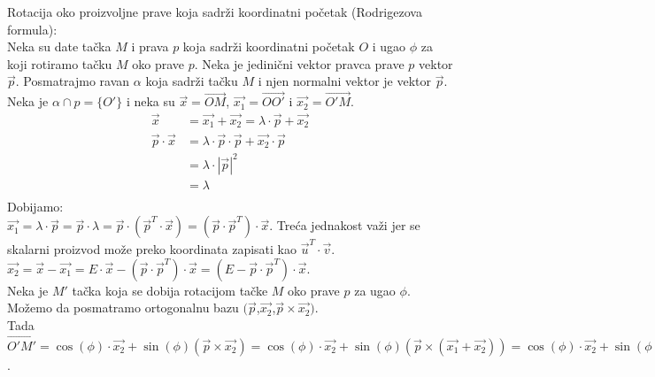 \documentclass[12pt]{article}
\begin{document}
    Rotacija oko proizvoljne prave koja sadrži koordinatni početak (Rodrigezova formula):\\
    Neka su date tačka $M$ i prava $p$ koja sadrži koordinatni početak $O$ i ugao $\phi$ za koji rotiramo tačku $M$ oko prave $p$.
    Neka je jedinični vektor pravca prave $p$ vektor $\overrightarrow{p}$.
    Posmatrajmo ravan $\alpha$ koja sadrži tačku $M$ i njen normalni vektor je vektor $\overrightarrow{p}$.
    Neka je $\alpha\cap p =\{O'\}$ i neka su $\overrightarrow{x}=\overrightarrow{OM}$, $\overrightarrow{x_1}=\overrightarrow{OO'}$ i $\overrightarrow{x_2}=\overrightarrow{O'M}$.
    \begin{align*}
        \overrightarrow{x}                        & =\overrightarrow{x_1}+\overrightarrow{x_2} = \lambda\cdot\overrightarrow{p}+\overrightarrow{x_2}   \\
        \overrightarrow{p}\cdot\overrightarrow{x} & =\lambda\cdot\overrightarrow{p}\cdot\overrightarrow{p}+\overrightarrow{x_2}\cdot\overrightarrow{p} \\
                                                  & =\lambda\cdot|\overrightarrow{p}|^2                                                                \\
                                                  & =\lambda                                                                                           \\
    \end{align*}
    Dobijamo:\\
$\overrightarrow{x_1}=\lambda\cdot \overrightarrow{p}=\overrightarrow{p}\cdot\lambda=\overrightarrow{p}\cdot(\overrightarrow{p}^T\cdot \overrightarrow{x})=(\overrightarrow{p}\cdot \overrightarrow{p}^T)\cdot \overrightarrow{x}$.
    Treća jednakost važi jer se skalarni proizvod može preko koordinata zapisati kao $\overrightarrow{u}^T\cdot \overrightarrow{v}$.\\
$\overrightarrow{x_2}=\overrightarrow{x}-\overrightarrow{x_1}=E\cdot\overrightarrow{x}-(\overrightarrow{p}\cdot \overrightarrow{p}^T)\cdot \overrightarrow{x}=(E-\overrightarrow{p}\cdot \overrightarrow{p}^T)\cdot \overrightarrow{x}$.\\
    Neka je $M'$ tačka koja se dobija rotacijom tačke $M$ oko prave $p$ za ugao $\phi$.
    Možemo da posmatramo ortogonalnu bazu $(\overrightarrow{p}$,$\overrightarrow{x_2}$,$\overrightarrow{p}\times\overrightarrow{x_2})$.\\
    Tada $\overrightarrow{O'M'}=\cos(\phi)\cdot\overrightarrow{x_2}+\sin(\phi)(\overrightarrow{p}\times\overrightarrow{x_2})=\cos(\phi)\cdot\overrightarrow{x_2}+\sin(\phi)(\overrightarrow{p}\times(\overrightarrow{x_1}+\overrightarrow{x_2}))=\cos(\phi)\cdot\overrightarrow{x_2}+\sin(\phi)(\overrightarrow{p}\times\overrightarrow{x})$.
\end{document}
